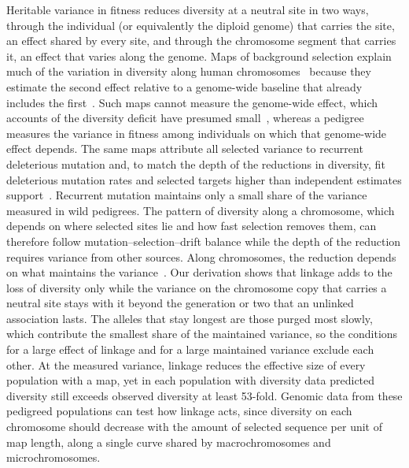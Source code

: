 \documentclass{article}
\begin{document}
Heritable variance in fitness reduces diversity at a neutral site in two ways, through the individual (or equivalently the diploid genome) that carries the site, an effect shared by every site, and through the chromosome segment that carries it, an effect that varies along the genome. Maps of background selection explain much of the variation in diversity along human chromosomes~\cite{murphy2023,buffaloKern2024} because they estimate the second effect relative to a genome-wide baseline that already includes the first~\cite{mcvicker2009,murphy2023}. Such maps cannot measure the genome-wide effect, which accounts of the diversity deficit have presumed small~\cite{matheson2024}, whereas a pedigree measures the variance in fitness among individuals on which that genome-wide effect depends. The same maps attribute all selected variance to recurrent deleterious mutation and, to match the depth of the reductions in diversity, fit deleterious mutation rates and selected targets higher than independent estimates support~\cite{murphy2023,buffaloKern2024}. Recurrent mutation maintains only a small share of the variance measured in wild pedigrees. The pattern of diversity along a chromosome, which depends on where selected sites lie and how fast selection removes them, can therefore follow mutation--selection--drift balance while the depth of the reduction requires variance from other sources. Along chromosomes, the reduction depends on what maintains the variance~\cite{hudson1995,nordborg1996,li2026}. Our derivation shows that linkage adds to the loss of diversity only while the variance on the chromosome copy that carries a neutral site stays with it beyond the generation or two that an unlinked association lasts. The alleles that stay longest are those purged most slowly, which contribute the smallest share of the maintained variance, so the conditions for a large effect of linkage and for a large maintained variance exclude each other. At the measured variance, linkage reduces the effective size of every population with a map, yet in each population with diversity data predicted diversity still exceeds observed diversity at least 53-fold. Genomic data from these pedigreed populations can test how linkage acts, since diversity on each chromosome should decrease with the amount of selected sequence per unit of map length, along a single curve shared by macrochromosomes and microchromosomes.
\end{document}
